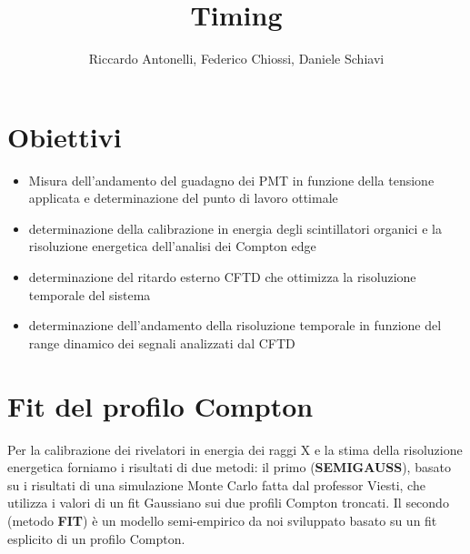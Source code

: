 \documentclass[a4paper,11pt,italian]{report}
\begin{document}
\setlength\parindent{0pt}

\author{Riccardo Antonelli, Federico Chiossi, Daniele Schiavi}
\title{Timing}

\maketitle

\section*{Obiettivi}


\begin{itemize}

\item Misura dell'andamento del guadagno dei PMT in funzione della tensione applicata e determinazione del punto di lavoro ottimale
\item determinazione della calibrazione in energia degli scintillatori organici e la risoluzione energetica dell'analisi dei Compton edge
\item determinazione del ritardo esterno CFTD che ottimizza la risoluzione temporale del sistema
\item determinazione dell'andamento della risoluzione temporale in funzione del range dinamico dei segnali analizzati dal CFTD

\end{itemize}

\section*{Fit del profilo Compton}
\label{sec:fitmethod}
Per la calibrazione dei rivelatori in energia dei raggi X e la stima della risoluzione energetica forniamo i risultati di due metodi: il primo (\textbf{SEMIGAUSS}), basato su i risultati di una simulazione Monte Carlo fatta dal professor Viesti, che utilizza i valori di un fit Gaussiano sui due profili Compton troncati. Il secondo (metodo \textbf{FIT}) è un modello semi-empirico da noi sviluppato basato su un fit esplicito di un profilo Compton.\\
\end{document}
